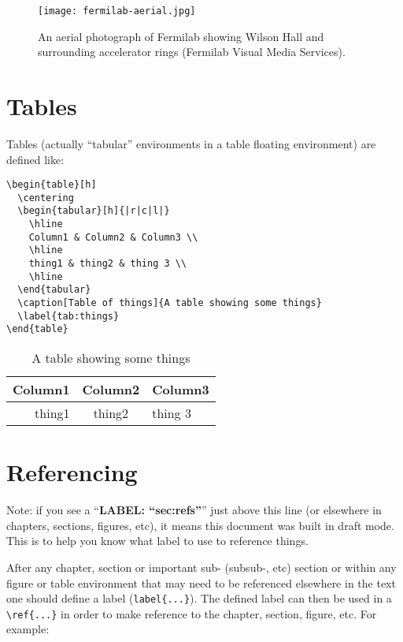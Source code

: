 \begin{figure}[h]
  \centering
  \texttt{[image: fermilab-aerial.jpg]}
  \caption[Aerial Photo of Fermilab]{An aerial photograph of Fermilab
    showing Wilson Hall and surrounding accelerator rings (Fermilab
    Visual Media Services).}
  \label{fig:fermilab-aerial}
\end{figure}

\section{Tables}
\label{sec:tables}

Tables (actually ``tabular'' environments in a table floating environment) are defined like:

\begin{verbatim}
\begin{table}[h]
  \centering
  \begin{tabular}[h]{|r|c|l|}
    \hline
    Column1 & Column2 & Column3 \\
    \hline
    thing1 & thing2 & thing 3 \\
    \hline
  \end{tabular}
  \caption[Table of things]{A table showing some things}
  \label{tab:things}
\end{table}
\end{verbatim}
\begin{table}[h]
  \centering
  \begin{tabular}[h]{|r|c|l|}
    \hline
    Column1 & Column2 & Column3 \\
    \hline
    thing1 & thing2 & thing 3 \\
    \hline
  \end{tabular}
  \caption[Table of things]{A table showing some things}
  \label{tab:things}
\end{table}

\section{Referencing}
\label{sec:refs}
Note: if you see a ``\textbf{LABEL: ``sec:refs''}'' just above this
line (or elsewhere in chapters, sections, figures, etc), it means this
document was built in draft mode.  This is to help you know what label
to use to reference things.

After any chapter, section or important sub- (subsub-, etc) section or
within any figure or table environment that may need to be referenced
elsewhere in the text one should define a label (\verb|label{...}|).
The defined label can then be used in a \verb|\ref{...}| in order to
make reference to the chapter, section, figure, etc.  For example:

